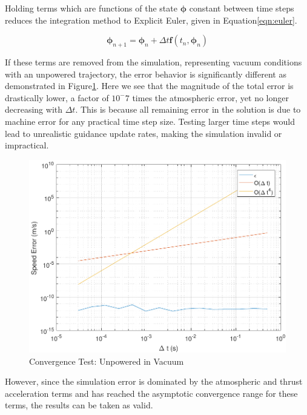 Holding terms which are functions of the state $\bm{\phi}$ constant between time steps reduces the integration method to Explicit Euler, given in Equation\:\ref{eqn:euler}. 

\begin{equation}
\label{eqn:euler}
\bm{\phi}_{n+1} = \bm{\phi}_n + \Delta t \bm{f}(t_n,\bm{\phi}_n)
\end{equation}

If these terms are removed from the simulation, representing vacuum conditions with an unpowered trajectory, the error behavior is significantly different as demonstrated in Figure\:\ref{fig:convtestvac}. Here we see that the magnitude of the total error is drastically lower, a factor of $10^-7$ times the atmospheric error, yet no longer decreasing with $\Delta t$. This is because all remaining error in the solution is due to machine error for any practical time step size. Testing larger time steps would lead to unrealistic guidance update rates, making the simulation invalid or impractical.


\begin{figure}[H]
	\centering
	\begin{minipage}{4.5 in}
		\includegraphics[width=\linewidth]{Figures/convtestvac.pdf}
		\caption{Convergence Test: Unpowered in Vacuum \label{fig:convtestvac} }
	\end{minipage}
\end{figure}

However, since the simulation error is dominated by the atmospheric and thrust acceleration terms and has reached the asymptotic convergence range for these terms, the results can be taken as valid.

